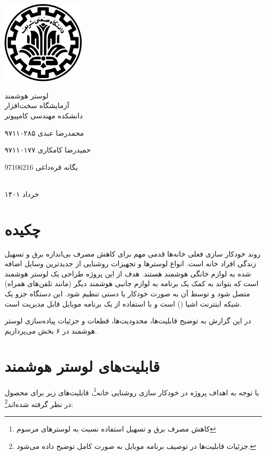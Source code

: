 \documentclass[12pt,a4paper]{article}
\begin{document}
	\thispagestyle{empty}
	\vspace*{0mm}
	\centerline{\includegraphics[height=4cm]{logo.png}}
	\vspace*{5mm}
	\begin{center}
		{\Huge
			لوستر هوشمند
		}
		\\[1cm]
		آزمایشگاه سخت‌افزار
		\\[1cm]
		دانشکده مهندسی کامپیوتر
		\\[4cm]
		{\large
			محمدرضا عبدی ۹۷۱۱۰۲۸۵
			
			حمیدرضا کامکاری ۹۷۱۱۰۱۷۷
			
			یگانه قره‌داغی 97106216
		}
		\\[5cm]
		خرداد ۱۴۰۱
	\end{center}
	\newpage
		\section*{چکیده}
	
	روند خودکار سازی فعلی خانه‌ها قدمی مهم برای کاهش مصرف بی‌اندازه برق و تسهیل زندگی افراد خانه است. انواع لوستر‌ها و تجهیزات روشنایی از جدیدترین وسایل اضافه شده به لوازم خانگی هوشمند هستند. هدف از این پروژه طراحی یک لوستر هوشمند است که بتواند به کمک یک برنامه به لوازم جانبی هوشمند دیگر (مانند تلفن‌های همراه) متصل شود و توسط آن به صورت خودکار یا دستی تنظیم شود. این دستگاه جزو یک شبکه اینترنت اشیا () است و با استفاده از یک برنامه موبایل قابل مدیریت است. 
	
	در این گزارش به توضیح قابلیت‌ها، محدودیت‌ها، قطعات و جزئیات پیاده‌سازی لوستر هوشمند در ۶ بخش می‌پردازیم.
	\newpage
	
	\tableofcontents
	
		\newpage
	
	\section{قابلیت‌های لوستر هوشمند}
	با توجه به اهداف پروژه در خودکار سازی روشنایی خانه\footnote{کاهش مصرف برق و تسهیل استفاده نسبت به لوسترهای مرسوم}، قابلیت‌های زیر برای محصول در نظر گرفته شده‌اند\footnote{جزئیات قابلیت‌ها در توصیف برنامه موبایل به صورت کامل توضیح داده‌ می‌شود.}:
	
\end{document}
